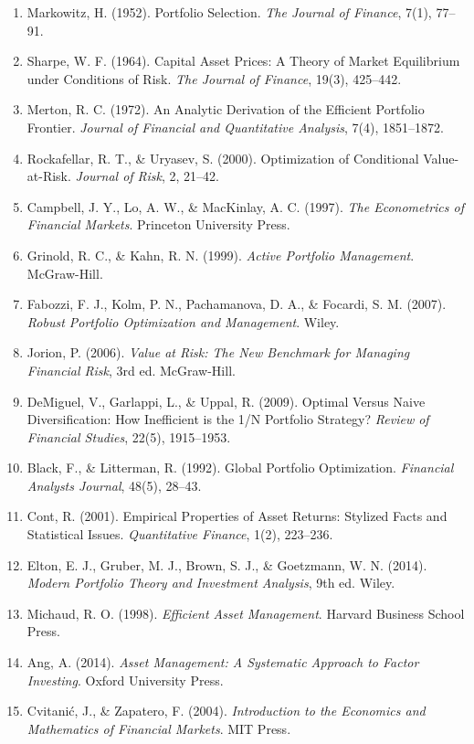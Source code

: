 \documentclass[a4paper, 11pt]{article}
\begin{document}
\begin{enumerate}
\item Markowitz, H. (1952). Portfolio Selection. \textit{The Journal of Finance}, 7(1), 77--91.
\item Sharpe, W. F. (1964). Capital Asset Prices: A Theory of Market Equilibrium under Conditions of Risk. \textit{The Journal of Finance}, 19(3), 425--442.
\item Merton, R. C. (1972). An Analytic Derivation of the Efficient Portfolio Frontier. \textit{Journal of Financial and Quantitative Analysis}, 7(4), 1851--1872.
\item Rockafellar, R. T., \& Uryasev, S. (2000). Optimization of Conditional Value-at-Risk. \textit{Journal of Risk}, 2, 21--42.
\item Campbell, J. Y., Lo, A. W., \& MacKinlay, A. C. (1997). \textit{The Econometrics of Financial Markets}. Princeton University Press.
\item Grinold, R. C., \& Kahn, R. N. (1999). \textit{Active Portfolio Management}. McGraw-Hill.
\item Fabozzi, F. J., Kolm, P. N., Pachamanova, D. A., \& Focardi, S. M. (2007). \textit{Robust Portfolio Optimization and Management}. Wiley.
\item Jorion, P. (2006). \textit{Value at Risk: The New Benchmark for Managing Financial Risk}, 3rd ed. McGraw-Hill.
\item DeMiguel, V., Garlappi, L., \& Uppal, R. (2009). Optimal Versus Naive Diversification: How Inefficient is the 1/N Portfolio Strategy? \textit{Review of Financial Studies}, 22(5), 1915--1953.
\item Black, F., \& Litterman, R. (1992). Global Portfolio Optimization. \textit{Financial Analysts Journal}, 48(5), 28--43.
\item Cont, R. (2001). Empirical Properties of Asset Returns: Stylized Facts and Statistical Issues. \textit{Quantitative Finance}, 1(2), 223--236.
\item Elton, E. J., Gruber, M. J., Brown, S. J., \& Goetzmann, W. N. (2014). \textit{Modern Portfolio Theory and Investment Analysis}, 9th ed. Wiley.
\item Michaud, R. O. (1998). \textit{Efficient Asset Management}. Harvard Business School Press.
\item Ang, A. (2014). \textit{Asset Management: A Systematic Approach to Factor Investing}. Oxford University Press.
\item Cvitanić, J., \& Zapatero, F. (2004). \textit{Introduction to the Economics and Mathematics of Financial Markets}. MIT Press.
\end{enumerate}
\end{document}

